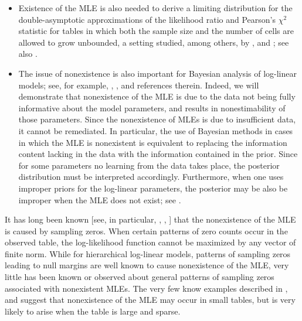 \documentclass[aos,MSNbibl,nameyear,dvips]{arximspdf}
\begin{document}
\begin{itemize}
%
\item Existence of the MLE is also needed to derive a limiting
distribution for the double-asymptotic approximations of the likelihood
ratio and Pearson's $\chi^2$ statistic for tables in which both the
sample size and the number of cells are allowed to grow unbounded, a
setting studied, among others, by \citet{MORRIS75}, \citet{HAB77} and
\citet{KOE86}; see also \citet{CR88}.
%
\item The issue of nonexistence is also important for Bayesian analysis
of log-linear models; see, for example, \citet{KB01}, \citet{MLD09},
\citet{DM10} and references therein. Indeed, we will demonstrate that
nonexistence of the MLE is due to the data not being fully informative
about the model parameters, and results in nonestimability of those
parameters. Since the nonexistence of MLEs
is due to insufficient data, it cannot be remediated. %
In particular, the use of Bayesian methods in cases in which the MLE is
nonexistent is equivalent to replacing the information content lacking
in the data with the information contained in the prior. %
Since for some parameters no learning from the data takes place, the
posterior distribution must be interpreted accordingly. Furthermore,
when one uses improper priors for the log-linear parameters, the
posterior may be also be improper when the MLE does not exist; see
\citet{JF}.
\end{itemize}

It has long been known [see, in particular, \citet{BIRCH63},
\citet{HAB74}, \citet{BFH75}] that the nonexistence of the MLE is
caused by sampling zeros. When certain patterns of zero counts occur in
the observed table, the log-likelihood function cannot be maximized by
any vector of finite norm. While for hierarchical log-linear models,
patterns of sampling zeros leading to null margins are well known to
cause nonexistence of the MLE, very little has been known or observed
about general patterns of sampling zeros associated with nonexistent
MLEs. The very few know examples described in \citet{HAB74},
\citet{ROY05} and \citet{DFRSZ09} suggest that nonexistence of the MLE
may occur in small tables, but is very likely to arise when the table
is large and sparse.
\end{document}
